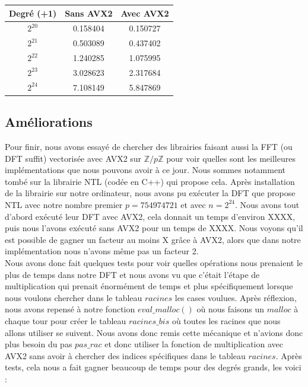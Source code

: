\documentclass[12pt, a4paper]{article}
\begin{document}
\begin{center}
\begin{tabular}{||c c c||}
\hline
Degré (+1) & Sans AVX2 & Avec AVX2 \\
\hline\hline
$2^{20}$ & 0.158404 & 0.150727 \\
\hline
$2^{21}$ & 0.503089 & 0.437402 \\
\hline
$2^{22}$ & 1.240285 & 1.075995 \\
\hline
$2^{23}$ & 3.028623 & 2.317684 \\
\hline
$2^{24}$ & 7.108149 & 5.847869 \\
\hline
\end{tabular}
\end{center}

\subsection{Améliorations}

Pour finir, nous avons essayé de chercher des librairies faisant aussi la FFT (ou DFT suffit) vectorisée avec AVX2 sur $\mathbb{Z}/p\mathbb{Z}$ pour voir quelles sont les meilleures implémentations que nous pouvons avoir à ce jour. Nous sommes notamment tombé sur la librairie NTL (codée en C++) qui propose cela. Après installation de la librairie sur notre ordinateur, nous avons pu exécuter la DFT que propose NTL avec notre nombre premier $p = 754974721$ et avec $n = 2^{24}$. Nous avons tout d'abord exécuté leur DFT avec AVX2, cela donnait un temps d'environ XXXX, puis nous l'avons exécuté sans AVX2 pour un temps de XXXX. Nous voyons qu'il est possible de gagner un facteur au moins X grâce à AVX2, alors que dans notre implémentation nous n'avons même pas un facteur 2. \\
Nous avons donc fait quelques tests pour voir quelles opérations nous prenaient le plus de temps dans notre DFT et nous avons vu que c'était l'étape de multiplication qui prenait énormément de temps et plus spécifiquement lorsque nous voulons chercher dans le tableau $racines$ les cases voulues. Après réflexion, nous avons repensé à notre fonction $eval\_malloc()$ où nous faisons un $malloc$ à chaque tour pour créer le tableau $racines\_bis$ où toutes les racines que nous allons utiliser se suivent. Nous avons donc remis cette mécanique et n'avions donc plus besoin du pas $pas\_rac$ et donc utiliser la fonction de multiplication avec AVX2 sans avoir à chercher des indices spécifiques dans le tableau $racines$. Après tests, cela nous a fait gagner beaucoup de temps pour des degrés grands, les voici : 
\end{document}
